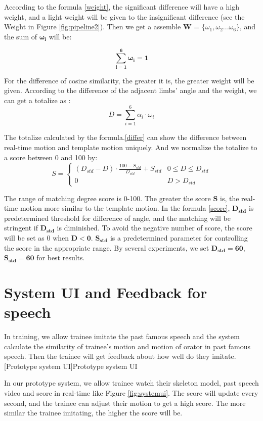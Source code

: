 \par According to the formula \ref{weight}, the significant difference will have a high weight, and a light weight will be given to the insignificant difference (see the Weight in Figure \ref {fig:pipeline2}). Then we get a assemble $\bm{W}$ = $\lbrace \omega_{1},\omega_{2}...\omega_{6}\rbrace$, and the sum of $\bm{\omega_{i}}$ will be:

\begin{equation}
\bm{\sum_{i=1}^{6} \omega_{i}=1}
\end{equation}

\par For the difference of cosine similarity, the greater it is, the greater weight will be given. According to the difference of the adjacent limbs' angle and the weight, we can get a totalize as :
\begin{equation}
D = \sum_{i=1}^{6}\alpha_{i}\cdot\omega_{i}		
\label{differ}
\end{equation}
\par The totalize calculated by the formula.\ref{differ} can show the difference between real-time motion and template motion uniquely. And we normalize the totalize to a score between 0 and 100 by:
\begin{equation}
S = \begin{cases}
	(D_{std}-D)\cdot\frac{100-S_{std}}{D_{std}}+S_{std} &  0\leq D\leq D_{std} \\ 0&  D> D_{std} 
 \end{cases}
 \label{score}
\end{equation}

\par The range of matching degree score is 0-100. The greater the score $\bm{S}$ is, the real-time motion more similar to the template motion. In the formula \ref{score}, $\bm{D_{std}}$ is predetermined threshold for difference of angle, and the matching will be stringent if $\bm{D_{std}}$ is diminished. To avoid the negative number of score, the score will be set as 0 when $\bm{D<0}$. $\bm{S_{std}}$ is a predetermined parameter for controlling the score in the appropriate range. By several experiments, we set $\bm{D_{std}=60}$, $\bm{S_{std}=60}$ for best results. 

\section{System UI and Feedback for speech}
\par In training, we allow trainee imitate the past famous speech and the system calculate the similarity of trainee's motion and motion of orator in past famous speech. Then the trainee will get feedback about how well do they imitate. 
[Prototype system UI]{Prototype system UI}
\par In our prototype system, we allow trainee watch their skeleton model, past speech video and score in real-time like Figure \ref{fig:systemui}. The score will update every second, and the trainee can adjust their motion to get a high score. The more similar the trainee imitating, the higher the score will be.

